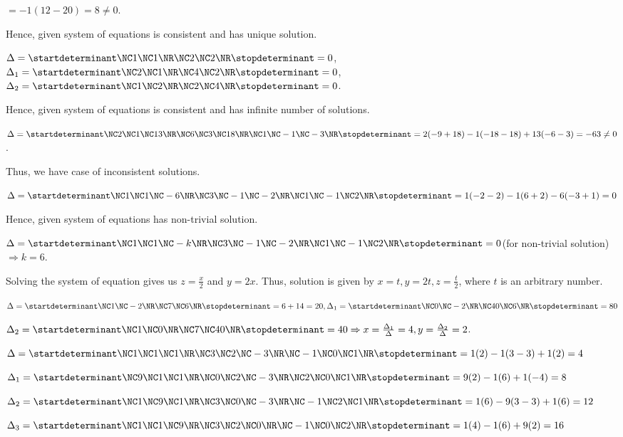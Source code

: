   $= -1(12 - 20) = 8\neq 0$.

  Hence, given system of equations is consistent and has unique solution.
\item $\Delta = \startdeterminant\NC 1 \NC 1\NR\NC 2\NC 2\NR\stopdeterminant = 0$, $\Delta_1
  = \startdeterminant\NC 2\NC 1\NR\NC 4\NC 2\NR\stopdeterminant = 0$, $\Delta_2 = \startdeterminant\NC 1\NC
  2\NR\NC 2\NC 4\NR\stopdeterminant = 0$.

  Hence, given system of equations is consistent and has infinite number of solutions.
\item $\Delta = \startdeterminant\NC 2\NC 1\NC 13\NR\NC 6 \NC 3\NC 18\NR\NC 1\NC -1\NC -3\NR\stopdeterminant
  = 2(-9+ 18) -1(-18 - 18) + 13(-6 - 3) = -63\neq 0$.

  Thus, we have case of inconsistent solutions.
\item $\Delta = \startdeterminant\NC 1\NC 1\NC -6\NR\NC 3\NC -1\NC -2\NR\NC 1\NC -1\NC 2\NR\stopdeterminant
  = 1(-2 - 2) - 1(6 + 2) -6(-3 + 1) = 0$

  Hence, given system of equations has non-trivial solution.
\item $\Delta = \startdeterminant\NC 1\NC 1\NC -k\NR\NC 3\NC -1\NC -2\NR\NC 1\NC -1\NC 2\NR\stopdeterminant
  = 0$(for non-trivial solution)$\Rightarrow k = 6$.

  Solving the system of equation gives us $z = \frac{x}{2}$ and $y = 2x$. Thus, solution is given by $x = t,
  y = 2t, z = \frac{t}{2}$, where $t$ is an arbitrary number.
\item $\Delta = \startdeterminant\NC 1\NC -2\NR\NC 7\NC 6\NR\stopdeterminant = 6 + 14 = 20, \Delta_1
  = \startdeterminant\NC 0\NC -2\NR\NC 40\NC 6\NR\stopdeterminant = 80$

  $\Delta_2 = \startdeterminant\NC 1\NC 0\NR\NC 7\NC 40\NR\stopdeterminant = 40\Rightarrow x =
  \frac{\Delta_1}{\Delta} = 4, y = \frac{\Delta_2}{\Delta} = 2$.
\item $\Delta = \startdeterminant\NC 1\NC 1\NC 1\NR\NC 3\NC 2\NC -3\NR\NC -1\NC 0\NC 1\NR\stopdeterminant =
  1(2) -1(3 - 3) + 1(2) = 4$

  $\Delta_1 = \startdeterminant\NC 9\NC 1\NC 1\NR\NC 0\NC 2\NC -3\NR\NC 2\NC 0\NC 1\NR\stopdeterminant =
  9(2) -1(6) + 1(-4) = 8$

  $\Delta_2 = \startdeterminant\NC 1\NC 9\NC 1\NR\NC 3\NC 0\NC -3\NR\NC -1\NC 2\NC 1\NR\stopdeterminant =
  1(6) -9(3 - 3) + 1(6) = 12$

  $\Delta_3 = \startdeterminant\NC 1\NC 1\NC 9\NR\NC 3\NC 2\NC 0\NR\NC -1\NC 0\NC 2\NR\stopdeterminant =
  1(4) -1(6) + 9(2) = 16$

